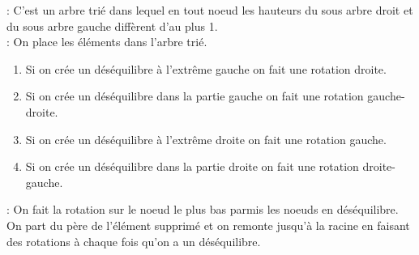  : C'est un arbre trié dans lequel en tout noeud les hauteurs du sous arbre droit et du sous arbre gauche diffèrent d'au plus 1. \\

 : On place les éléments dans l'arbre trié. 
\begin{enumerate}
  \item Si on crée un déséquilibre à l'extrême gauche on fait une rotation droite.
  \item Si on crée un déséquilibre dans la partie gauche on fait une rotation gauche-droite.
  \item Si on crée un déséquilibre à l'extrême droite on fait une rotation gauche.
  \item Si on crée un déséquilibre dans la partie droite on fait une rotation droite-gauche. 
\end{enumerate}

 : On fait la rotation sur le noeud le plus bas parmis les noeuds en déséquilibre.\\

 On part du père de l'élément supprimé et on remonte jusqu'à la racine en faisant des rotations à chaque fois qu'on a un déséquilibre.


